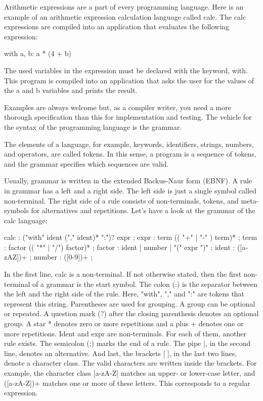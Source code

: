 
Arithmetic expressions are a part of every programming language. Here is an example of an arithmetic expression calculation language called calc. The calc expressions are compiled into an application that evaluates the following expression:

\begin{shell}
with a, b: a * (4 + b)
\end{shell}

The used variables in the expression must be declared with the keyword, with. This program is compiled into an application that asks the user for the values of the a and b variables and prints the result.

Examples are always welcome but, as a compiler writer, you need a more thorough specification than this for implementation and testing. The vehicle for the syntax of the programming language is the grammar.


The elements of a language, for example, keywords, identifiers, strings, numbers, and operators, are called tokens. In this sense, a program is a sequence of tokens, and the grammar specifies which sequences are valid.

Usually, grammar is written in the extended Backus-Naur form (EBNF). A rule in grammar has a left and a right side. The left side is just a single symbol called non-terminal. The right side of a rule consists of non-terminals, tokens, and meta-symbols for alternatives and repetitions. Let’s have a look at the grammar of the calc language:

\begin{shell}
calc : ("with" ident ("," ident)* ":")? expr ;
expr : term (( "+" | "-" ) term)* ;
term : factor (( "*" | "/") factor)* ;
factor : ident | number | "(" expr ")" ;
ident : ([a-zAZ])+ ;
number : ([0-9])+ ;
\end{shell}

In the first line, calc is a non-terminal. If not otherwise stated, then the first non-terminal of a grammar is the start symbol. The colon (:) is the separator between the left and the right side of the rule. Here, "with", "," and ":" are tokens that represent this string. Parentheses are used for grouping. A group can be optional or repeated. A question mark (?) after the closing parenthesis denotes an optional group. A star * denotes zero or more repetitions and a plus + denotes one or more repetitions. Ident and expr are non-terminals. For each of them, another rule exists. The semicolon (;) marks the end of a rule. The pipe |, in the second line, denotes an alternative. And last, the brackets [ ], in the last two lines, denote a character class. The valid characters are written inside the brackets. For example, the character class [a-zA-Z] matches an upper- or lower-case letter, and ([a-zA-Z])+ matches one or more of these letters. This corresponds to a regular expression.

